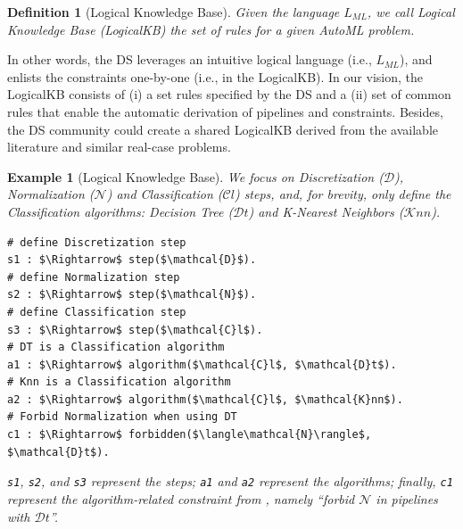 \documentclass[5p,times]{elsarticle}
\newtheorem{example}{Example}
\newtheorem{definition}{Definition}
\begin{document}

\begin{definition}[Logical Knowledge Base]
Given the language $L_{ML}$, we call Logical Knowledge Base (LogicalKB) the set of rules for a given AutoML problem.
\end{definition}


In other words, the DS leverages an intuitive logical language (i.e., $L_{ML}$), and enlists the constraints one-by-one (i.e., in the LogicalKB).
In our vision, the LogicalKB consists of (i) a set rules specified by the DS and a (ii) set of common rules that enable the automatic derivation of pipelines and constraints.
Besides, the DS community could create a shared LogicalKB derived from the available literature and similar real-case problems.

\begin{example}[Logical Knowledge Base]\label{ex:kb}
We focus on Discretization ($\mathcal{D}$),  Normalization ($\mathcal{N}$) and Classification ($\mathcal{C}l$) steps, and, for brevity, only define the Classification algorithms: Decision Tree ($\mathcal{D}t$) and K-Nearest Neighbors ($\mathcal{K}nn$).
\begin{lstlisting}[mathescape=true]
# define Discretization step
s1 : $\Rightarrow$ step($\mathcal{D}$).
# define Normalization step
s2 : $\Rightarrow$ step($\mathcal{N}$).
# define Classification step
s3 : $\Rightarrow$ step($\mathcal{C}l$).
# DT is a Classification algorithm
a1 : $\Rightarrow$ algorithm($\mathcal{C}l$, $\mathcal{D}t$).
# Knn is a Classification algorithm
a2 : $\Rightarrow$ algorithm($\mathcal{C}l$, $\mathcal{K}nn$).
# Forbid Normalization when using DT
c1 : $\Rightarrow$ forbidden($\langle\mathcal{N}\rangle$, $\mathcal{D}t$).
\end{lstlisting}
\noindent \texttt{s1}, \texttt{s2}, and \texttt{s3} represent the steps; \texttt{a1} and \texttt{a2} represent the algorithms; finally, \texttt{c1} represent the algorithm-related constraint from , namely ``forbid $\mathcal{N}$ in pipelines with $\mathcal{D}t$''.
\end{example}
\end{document}
